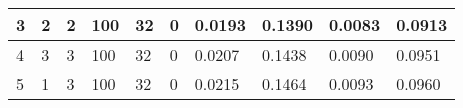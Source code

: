 \begin{table}
{\begin{tabular}{|llllllllll|}
3             & 2                                                               & 2                                                               & 100            & 32                                                             & 0                & 0.0193                                                                    & 0.1390                                                                   & 0.0083                                                               & 0.0913                                                              \\ \hline
4             & 3                                                               & 3                                                               & 100            & 32                                                             & 0                & 0.0207                                                                    & 0.1438                                                                   & 0.0090                                                               & 0.0951                                                              \\ \hline
5             & 1                                                               & 3                                                               & 100            & 32                                                             & 0                & 0.0215                                                                    & 0.1464                                                                   & 0.0093                                                               & 0.0960                                                              \\ \hline
\end{tabular}}
\end{table}

